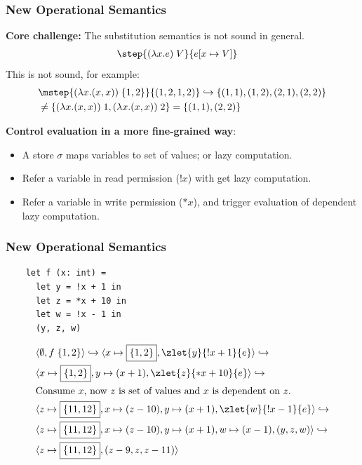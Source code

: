 \begin{frame}[fragile]
    \frametitle{New Operational Semantics}

\textbf{Core challenge:} The substitution semantics is not sound in general.
\begin{align*}
    &\step{(\lambda x.e)\;V}{e[x\mapsto V]}
\end{align*}
This is not sound, for example:
\begin{align*}
    &\mstep{(\lambda x.(x, x))\;\{1,2\}}{({1,2}, {1, 2})}\hookrightarrow\{(1,1), (1,2), (2,1), (2,2)\}
    \\&\neq \{(\lambda x.(x, x))\;1, (\lambda x.(x, x))\;2 \} = \{(1,1), (2,2)\}
\end{align*}

\textbf{Control evaluation in a more fine-grained way}:
\begin{itemize}
    \item A store $\sigma$ maps variables to set of values; or lazy computation.
    \item Refer a variable in read permission ($!x$) with get lazy computation.
    \item Refer a variable in write permission ($*x$), and trigger evaluation of dependent lazy computation.
\end{itemize}
        
\end{frame}

\begin{frame}[fragile]
    \frametitle{New Operational Semantics}

\begin{verbatim}
    let f (x: int) = 
      let y = !x + 1 in
      let z = *x + 10 in
      let w = !x - 1 in
      (y, z, w)
\end{verbatim}
       
\begin{align*}
      &\store{\emptyset, f\;\{1,2\}} \hookrightarrow \store{x\mapsto\boxed{\{1,2\}}, \zlet{y}{!x + 1}{e}} \hookrightarrow
    \\&\store{x\mapsto\boxed{\{1,2\}}, y\mapsto (x + 1), \zlet{z}{*x + 10}{e}} \hookrightarrow
    \\&\text{Consume $x$, now $z$ is set of values and $x$ is dependent on $z$.}
    \\&\store{z\mapsto\boxed{\{11,12\}}, x\mapsto(z - 10), y\mapsto (x + 1), \zlet{w}{!x - 1}{e}} \hookrightarrow
    \\&\store{z\mapsto\boxed{\{11,12\}}, x\mapsto(z - 10), y\mapsto (x + 1), w\mapsto (x - 1), (y, z, w)} \hookrightarrow
    \\&\store{z\mapsto\boxed{\{11,12\}}, (z - 9, z, z-11)}
\end{align*}

\end{frame}

